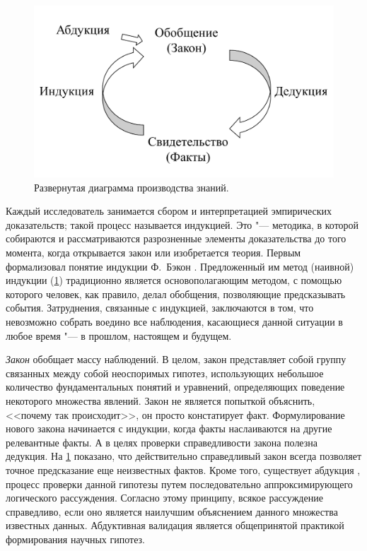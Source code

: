 \begin{figure}[ht]
    \centering
    \includegraphics[width=0.7\linewidth]{images/science_lifecycle}
    \caption{Развернутая диаграмма производства знаний.}\label{fig:knowledge_production}
\end{figure}

Каждый исследователь занимается сбором и интерпретацией эмпирических доказательств; такой процесс называется индукцией. 
Это "--- методика, в которой собираются и рассматриваются разрозненные элементы доказательства до того момента, когда 
открывается закон или изобретается теория. Первым формализовал понятие индукции Ф.~Бэкон \cite{Bacon2000}. 
Предложенный им метод (наивной) индукции (\cref{fig:knowledge_production}) традиционно является основополагающим 
методом, с помощью которого человек, как правило, делал обобщения, позволяющие предсказывать события. Затруднения, 
связанные с индукцией, заключаются в том, что невозможно собрать воедино все наблюдения, касающиеся данной ситуации 
в любое время "--- в прошлом, настоящем и будущем.  

\textit{Закон} обобщает массу наблюдений. В целом, закон представляет собой группу связанных между собой неоспоримых 
гипотез, использующих небольшое количество фундаментальных понятий и уравнений, определяющих поведение некоторого 
множества явлений. Закон не является попыткой объяснить, <<почему так происходит>>, он просто констатирует факт. 
Формулирование нового закона начинается с индукции, когда факты наслаиваются на другие релевантные факты. А в целях 
проверки справедливости закона полезна дедукция.  На \cref{fig:knowledge_production} показано, что действительно 
справедливый закон всегда позволяет точное предсказание еще неизвестных фактов.  Кроме того, существует абдукция 
\cite{Menzies1996}, процесс проверки данной гипотезы путем последовательно аппроксимирующего логического рассуждения. 
Согласно этому принципу, всякое рассуждение справедливо, если оно является наилучшим объяснением данного множества 
известных данных. Абдуктивная валидация является общепринятой практикой формирования научных гипотез.

